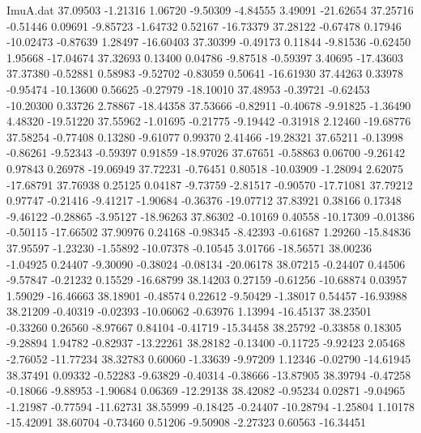 \begin{filecontents}{ImuA.dat}
  37.09503   -1.21316    1.06720   -9.50309   -4.84555    3.49091  -21.62654
  37.25716   -0.51446    0.09691   -9.85723   -1.64732    0.52167  -16.73379
  37.28122   -0.67478    0.17946  -10.02473   -0.87639    1.28497  -16.60403
  37.30399   -0.49173    0.11844   -9.81536   -0.62450    1.95668  -17.04674
  37.32693    0.13400    0.04786   -9.87518   -0.59397    3.40695  -17.43603
  37.37380   -0.52881    0.58983   -9.52702   -0.83059    0.50641  -16.61930
  37.44263    0.33978   -0.95474  -10.13600    0.56625   -0.27979  -18.10010
  37.48953   -0.39721   -0.62453  -10.20300    0.33726    2.78867  -18.44358
  37.53666   -0.82911   -0.40678   -9.91825   -1.36490    4.48320  -19.51220
  37.55962   -1.01695   -0.21775   -9.19442   -0.31918    2.12460  -19.68776
  37.58254   -0.77408    0.13280   -9.61077    0.99370    2.41466  -19.28321
  37.65211   -0.13998   -0.86261   -9.52343   -0.59397    0.91859  -18.97026
  37.67651   -0.58863    0.06700   -9.26142    0.97843    0.26978  -19.06949
  37.72231   -0.76451    0.80518  -10.03909   -1.28094    2.62075  -17.68791
  37.76938    0.25125    0.04187   -9.73759   -2.81517   -0.90570  -17.71081
  37.79212    0.97747   -0.21416   -9.41217   -1.90684   -0.36376  -19.07712
  37.83921    0.38166    0.17348   -9.46122   -0.28865   -3.95127  -18.96263
  37.86302   -0.10169    0.40558  -10.17309   -0.01386   -0.50115  -17.66502
  37.90976    0.24168   -0.98345   -8.42393   -0.61687    1.29260  -15.84836
  37.95597   -1.23230   -1.55892  -10.07378   -0.10545    3.01766  -18.56571
  38.00236   -1.04925    0.24407   -9.30090   -0.38024   -0.08134  -20.06178
  38.07215   -0.24407    0.44506   -9.57847   -0.21232    0.15529  -16.68799
  38.14203    0.27159   -0.61256  -10.68874    0.03957    1.59029  -16.46663
  38.18901   -0.48574    0.22612   -9.50429   -1.38017    0.54457  -16.93988
  38.21209   -0.40319   -0.02393  -10.06062   -0.63976    1.13994  -16.45137
  38.23501   -0.33260    0.26560   -8.97667    0.84104   -0.41719  -15.34458
  38.25792   -0.33858    0.18305   -9.28894    1.94782   -0.82937  -13.22261
  38.28182   -0.13400   -0.11725   -9.92423    2.05468   -2.76052  -11.77234
  38.32783    0.60060   -1.33639   -9.97209    1.12346   -0.02790  -14.61945
  38.37491    0.09332   -0.52283   -9.63829   -0.40314   -0.38666  -13.87905
  38.39794   -0.47258   -0.18066   -9.88953   -1.90684    0.06369  -12.29138
  38.42082   -0.95234    0.02871   -9.04965   -1.21987   -0.77594  -11.62731
  38.55999   -0.18425   -0.24407  -10.28794   -1.25804    1.10178  -15.42091
  38.60704   -0.73460    0.51206   -9.50908   -2.27323    0.60563  -16.34451

\end{filecontents}
